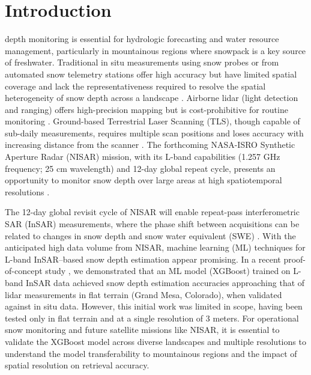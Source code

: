 \documentclass[lettersize,journal]{IEEEtran}
\begin{document}
\section{Introduction}

 depth monitoring is essential for hydrologic forecasting and water resource management, particularly in mountainous regions where snowpack is a key source of freshwater. Traditional in situ measurements using snow probes \cite{sturm2018automatic} or from automated snow telemetry  stations \cite{ryan2008evaluation, serreze1999characteristics} offer high accuracy but have limited spatial coverage and lack the representativeness required to resolve the spatial heterogeneity of snow depth across a landscape \cite{trujillo2015theoretical}. Airborne lidar (light detection and ranging) offers high-precision mapping but is cost-prohibitive for routine monitoring \cite{deems2013lidar}. Ground-based Terrestrial Laser Scanning (TLS), though capable of sub-daily measurements, requires multiple scan positions and loses accuracy with increasing distance from the scanner \cite{prokop2008assessing, grunewald2014elevation, lopez2017using, mazzotti2019revisiting, buhrle2023spatially}. The forthcoming NASA-ISRO Synthetic Aperture Radar (NISAR) mission, with its L-band capabilities (1.257 GHz frequency; 25 cm wavelength) and 12-day global repeat cycle, presents an opportunity to monitor snow depth over large areas at high spatiotemporal resolutions \cite{nisar2018handbook}.

The 12-day global revisit cycle of NISAR will enable repeat-pass interferometric SAR (InSAR) measurements, where the phase shift between acquisitions can be related to changes in snow depth and snow water equivalent (SWE) \cite{marshall2021band, tarricone2022estimating, hoppinen2023snow}. With the anticipated high data volume from NISAR, machine learning (ML) techniques for L-band InSAR–based snow depth estimation appear promising. In a recent proof-of-concept study \cite{alabi5advancing}, we demonstrated that an ML model (XGBoost) trained on L-band InSAR data achieved snow depth estimation accuracies approaching that of lidar measurements in flat terrain (Grand Mesa, Colorado), when validated against in situ data. However, this initial work was limited in scope, having been tested only in flat terrain and at a single resolution of 3 meters. For operational snow monitoring and future satellite missions like NISAR, it is essential to validate the XGBoost model across diverse landscapes and multiple resolutions to understand the model transferability to mountainous regions and the impact of spatial resolution on retrieval accuracy.
\end{document}
